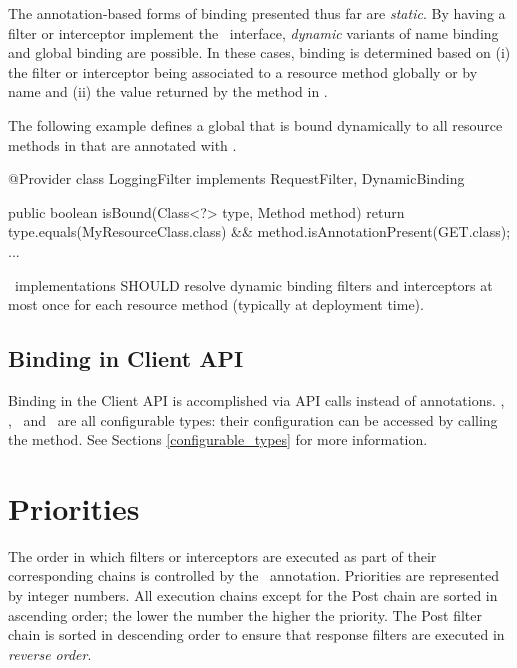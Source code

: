 The annotation-based forms of binding presented thus far are {\em static}.  By having a filter or interceptor implement the \DynamicBinding\ interface, {\em dynamic} variants of name binding and global binding are possible. In these cases, binding is determined based on (i) the filter or interceptor being associated to a resource method globally or by name and (ii) the value returned by the  method in \DynamicBinding. 

The following example defines a global  that is bound dynamically to all resource methods in  that are annotated with .

\begin{listing}{1}
@Provider
class LoggingFilter implements RequestFilter, DynamicBinding {

    public boolean isBound(Class<?> type, Method method) {
        return type.equals(MyResourceClass.class) 
            && method.isAnnotationPresent(GET.class);    
    }
    ...
}
\end{listing}

\jaxrs\ implementations SHOULD resolve dynamic binding filters and interceptors at most once for each resource method (typically at deployment time).

\subsection{Binding in Client API}
\label{binding_in_client_api}

Binding in the Client API is accomplished via API calls instead of annotations. \Client, \Invocation, \InvocationBuilder\ and \WebTarget\ are all configurable types: their configuration can be accessed by calling the  method. See Sections \ref{configurable_types} for more information.

\section{Priorities}
\label{priorities}

The order in which filters or interceptors are executed as part of their corresponding chains is controlled by the \BindingPriority\ annotation.
Priorities are represented by integer numbers. All execution chains except
for the Post chain are sorted in ascending order; the lower the number the higher the priority. The Post filter chain is sorted in descending order to ensure that response filters are executed in {\em reverse order}.

